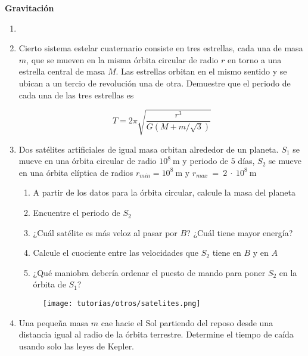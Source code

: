 \documentclass[letterpaper,11pt]{article}
\begin{document}

\begin{center}
	\LARGE\textbf{Gravitación}
\end{center}

\vspace{-1cm}
\begin{enumerate}\setlength{\itemsep}{0.4cm}

\item[]

\item Cierto sistema estelar cuaternario consiste en tres estrellas, cada una de masa $m$, que se mueven en la misma órbita circular de radio $r$ en torno a una estrella central de masa $M$. Las estrellas orbitan en el mismo sentido y se ubican a un tercio de revolución una de otra. Demuestre que el periodo de cada una de las tres estrellas es

$$T = 2\pi \sqrt{\frac{r^3}{G \left(M + m / \sqrt{3} \right)}}$$

\item Dos satélites artificiales de igual masa orbitan alrededor de un planeta. $S_1$ se mueve en una órbita circular de radio $10^8\SI{}{\meter}$ y periodo de $5$ días, $S_2$ se mueve en una órbita elíptica de radios $r_{min} = 10^8\SI{}{\meter}$ y $r_{max}~=~2~\cdot~10^8\SI{}{\meter}$

\begin{multicols}{2}
    \begin{enumerate}
        \item A partir de los datos para la órbita circular, calcule la masa del planeta
        \item Encuentre el periodo de $S_2$
        \item ¿Cuál satélite es más veloz al pasar por $B$? ¿Cuál tiene mayor energía?
        \item Calcule el cuociente entre las velocidades que $S_2$ tiene en $B$ y en $A$
        \item ¿Qué maniobra debería ordenar el puesto de mando para poner $S_2$ en la órbita de $S_1$?
    \end{enumerate}

    \columnbreak

    \begin{figure}[H]
        \centering
        \texttt{[image: tutorías/otros/satelites.png]}
    \end{figure}


\end{multicols}

\item Una pequeña masa $m$ cae hacie el Sol partiendo del reposo desde una distancia igual al radio de la órbita terrestre. Determine el tiempo de caída usando solo las leyes de Kepler.



%   

\end{enumerate}
\end{document}
